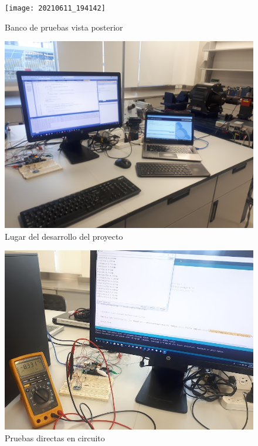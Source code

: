 \documentclass[12pt,titlepage]{article}
\begin{document}
\begin{figure}[H]
\hspace*{2.1cm} 
\texttt{[image: 20210611\_194142]}
\caption{Banco de pruebas vista posterior}
\end{figure}

\newpage
\begin{figure}[H]
\hspace*{1.5cm} 
\includegraphics[scale=0.095]{20210702_200549}
\caption{Lugar del desarrollo del proyecto}
\end{figure}

\begin{figure}[H]
\hspace*{1.5cm} 
\includegraphics[scale=0.59]{20210702_191346}
\caption{Pruebas directas en circuito}
\end{figure}
\end{document}
